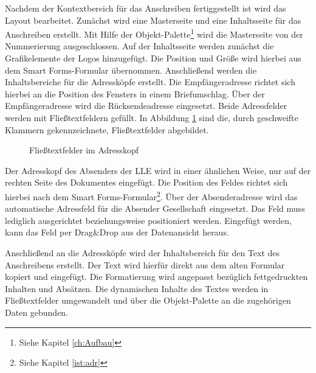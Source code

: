 Nachdem der Kontextbereich für das Anschreiben fertiggestellt ist wird das Layout bearbeitet. Zunächst wird eine Masterseite und eine Inhaltsseite für das Anschreiben erstellt. Mit Hilfe der Objekt-Palette\footnote{Siehe Kapitel \ref{ch:Aufbau}} wird die Masterseite von der Nummerierung ausgeschlossen. Auf der Inhaltsseite werden zunächst die Grafikelemente der Logos hinzugefügt. Die Position und Größe wird hierbei aus dem Smart Forms-Formular übernommen. Anschließend werden die Inhaltsbereiche für die Adressköpfe erstellt. Die Empfängeradresse richtet sich hierbei an die Position des Fensters in einem Briefumschlag. Über der Empfängeradresse wird die Rücksendeadresse eingesetzt. Beide Adressfelder werden mit Fließtextfeldern gefüllt. In Abbildung \ref{if:adr} sind die, durch geschweifte Klammern gekennzeichnete, Fließtextfelder abgebildet.

 \begin{figure}[ht]
	\centering
	\caption{Fließtextfelder im Adresskopf}
	\label{if:adr}
\end{figure}

Der Adresskopf des Absenders der \ac{LLE} wird in einer ähnlichen Weise, nur auf der rechten Seite des Dokumentes eingefügt. Die Position des Feldes richtet sich hierbei nach dem Smart Forms-Formular\footnote{Siehe Kapitel \ref{ist:adr}}. Über der Absenderadresse wird das automatische Adressfeld für die Absender Gesellschaft eingesetzt. Das Feld muss lediglich ausgerichtet beziehungsweise positioniert werden.  Eingefügt werden, kann das Feld per Drag\&Drop aus der Datenansicht heraus.

Anschließend an die Adressköpfe wird der Inhaltsbereich für den Text des Anschreibens erstellt. Der Text wird hierfür direkt aus dem alten Formular kopiert und eingefügt. Die Formatierung wird angepasst bezüglich fettgedruckten Inhalten und Absätzen. Die dynamischen Inhalte des Textes werden in Fließtextfelder umgewandelt und über die Objekt-Palette an die zugehörigen Daten gebunden.

